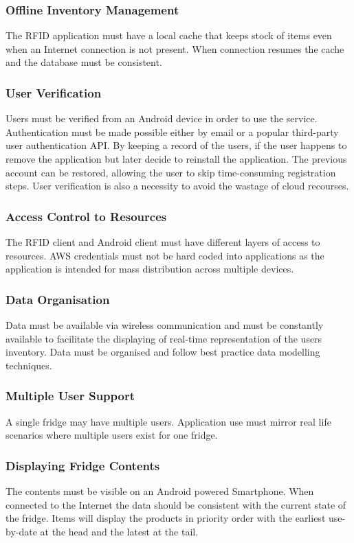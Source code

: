 \documentclass[a4paper, 11pt]{article}
\begin{document}
\subsubsection{Offline Inventory Management}
The RFID application must have a local cache that keeps stock of items even when an Internet connection is not present. When connection resumes the cache and the database must be consistent. 

\subsubsection{User Verification}
Users must be verified from an Android device in order to use the service. Authentication must be made possible either by email or a popular third-party user authentication API. By keeping a record of the users, if the user happens to remove the application but later decide to reinstall the application. The previous account can be restored, allowing the user to skip time-consuming registration steps. User verification is also a necessity to avoid the wastage of cloud recourses.

\subsubsection{Access Control to Resources}
The RFID client and Android client must have different layers of access to resources. AWS credentials must not be hard coded into applications as the application is intended for mass distribution across multiple devices.

\subsubsection{Data Organisation}
Data must be available via wireless communication and must be constantly available to facilitate the displaying of real-time representation of the users inventory. Data must be organised and follow best practice data modelling techniques. 

\subsubsection{Multiple User Support}
A single fridge may have multiple users. Application use must mirror real life scenarios where multiple users exist for one fridge. 

\subsubsection{Displaying Fridge Contents}
The contents must be visible on an Android powered Smartphone. When connected to the Internet the data should be consistent with the current state of the fridge. Items will display the products in priority order with the earliest use-by-date at the head and the latest at the tail. 
\end{document}
